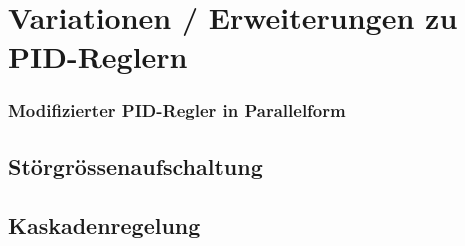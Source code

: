 \section{Variationen / Erweiterungen zu PID-Reglern}

\subsubsection{Modifizierter PID-Regler in Parallelform}




\subsection{Störgrössenaufschaltung}


\subsection{Kaskadenregelung}